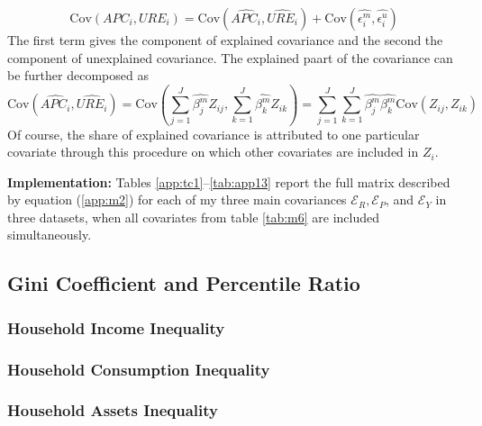 \documentclass[11pt,letterpaper]{article}
\begin{document}
\begin{equation}
\mathrm{Cov}(APC_{i},URE_{i}) = \mathrm{Cov}(\widehat{APC_{i}},\widehat{URE_{i}}) + \mathrm{Cov}(\widehat{\epsilon_{i}^{m}},\widehat{\epsilon_{i}^{u}})
\end{equation}
The first term gives the component of explained covariance and the second the component of unexplained covariance. The explained paart of the covariance can be further decomposed as 
\begin{equation}\label{app:m2}
\mathrm{Cov}(\widehat{APC_{i}},\widehat{URE_{i}}) = \mathrm{Cov}(\sum_{j=1}^{J}\widehat{\beta_{j}^{m}}Z_{ij},\sum_{k=1}^{J}\widehat{\beta_{k}^{m}}Z_{ik}) = \sum_{j=1}^{J}\sum_{k=1}^{J}\widehat{\beta_{j}^{m}}\widehat{\beta_{k}^{m}}\mathrm{Cov}(Z_{ij},Z_{ik})
\end{equation}
Of course, the share of explained covariance is attributed to one particular covariate through this procedure on which other covariates are included in $Z_{i}$. 

\vspace{1em}
\noindent \textbf{Implementation: } Tables \ref{app:tc1}--\ref{tab:app13} report the full matrix described by equation (\ref{app:m2}) for each of my three main covariances $\mathcal{E}_{R}, \mathcal{E}_{P}$, and $\mathcal{E}_{Y}$ in three datasets, when all covariates from table \ref{tab:m6} are included simultaneously.

	    
	
	    

	
	    

\clearpage
\subsection{Gini Coefficient and Percentile Ratio}
\subsubsection{Household Income Inequality}

\subsubsection{Household Consumption Inequality}

\subsubsection{Household Assets Inequality}
    
\end{document}

